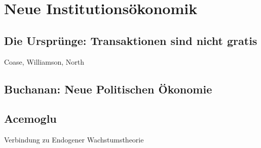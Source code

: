 %
%
%

\chapter{Neue Institutionsökonomik}
\label{Neue Institut}

\section{Die Ursprünge: Transaktionen sind nicht gratis} \label{sec: Neue Inst}
Coase, Williamson, North

\section{Buchanan: Neue Politischen Ökonomie}


\section{Acemoglu}
Verbindung zu Endogener Wachstumstheorie